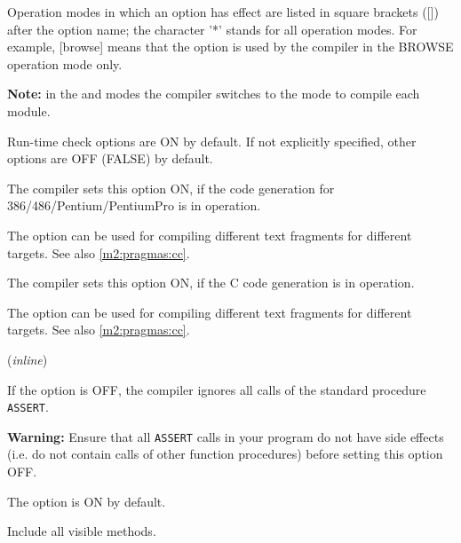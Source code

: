 Operation  modes  in  which  an  option has effect are listed
in square brackets ([]) after the option name; the character
'*' stands for all operation  modes. For example, [browse] means
that  the  option is used by the compiler in the BROWSE operation mode
only.

{\bf Note:} in the  and
 modes the compiler switches to
the  mode to compile each module.

Run-time check options are ON by default. If not explicitly
specified, other options are OFF (FALSE) by default.

\newcommand{\inline}{({\em inline})}
\newcommand{\header}{({\em header})}

\ifonline \else
\begin{description}
\fi

        \MLBegin{}\ModeC{}\MLEnd{}

        The compiler sets this option ON, if the code generation for
        386/486/Pentium/PentiumPro is in operation.

        The option can be used for compiling different text fragments
        for different targets. See also \ref{m2:pragmas:cc}.

        \MLBegin{}\ModeC{}\MLEnd{}

        The compiler sets this option ON, if the C code generation is
        in operation.

        The option can be used for compiling different text fragments
        for different targets. See also \ref{m2:pragmas:cc}.

        \MLBegin{}\ModeC{}\MLEnd{} \inline

        If the option is OFF, the compiler ignores all calls
        of the standard procedure \verb'ASSERT'.

        {\bf Warning:} Ensure that all \verb'ASSERT' calls in
        your program do not have side effects (i.e. do not contain
        calls of other function procedures) before setting this option OFF.

        The option is ON by default.


        \MLBegin{}\ModeB{}\MLEnd{}

        Include all visible methods.


\end{description}
